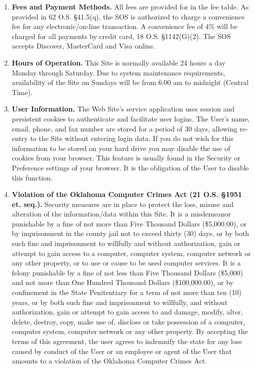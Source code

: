 \begin{enumerate}
    \item \textbf{Fees and Payment Methods.} All fees are provided for in the
    fee table. As provided in 62 O.S. §41.5(q), the SOS is authorized to charge
    a convenience fee for any electronic/on-line transaction. A convenience fee
    of 4\% will be charged for all payments by credit card, 18 O.S. §1142(G)(2).
    The SOS accepts Discover, MasterCard and Visa online.

    \item \textbf{Hours of Operation.} This Site is normally available 24 hours
    a day Monday through Saturday. Due to system maintenance requirements,
    availability of the Site on Sundays will be from 6:00 am to midnight
    (Central Time).

    \item \textbf{User Information.} The Web Site's service application uses
    session and persistent cookies to authenticate and facilitate user logins.
    The User's name, email, phone, and fax number are stored for a period of 30
    days, allowing re-entry to the Site without entering login data. If you do
    not wish for this information to be stored on your hard drive you may
    disable the use of cookies from your browser. This feature is usually found
    in the Security or Preference settings of your browser. It is the obligation
    of the User to disable this function.

    \item \textbf{Violation of the Oklahoma Computer Crimes Act (21 O.S. §1951
    et. seq.).} Security measures are in place to protect the loss, misuse and
    alteration of the information/data within this Site. It is a misdemeanor
    punishable by a fine of not more than Five Thousand Dollars (\$5,000.00), or
    by imprisonment in the county jail not to exceed thirty (30) days, or by
    both such fine and imprisonment to willfully and without authorization, gain
    or attempt to gain access to a computer, computer system, computer network
    or any other property, or to use or cause to be used computer services. It
    is a felony punishable by a fine of not less than Five Thousand Dollars
    (\$5,000) and not more than One Hundred Thousand Dollars (\$100,000.00), or
    by confinement in the State Penitentiary for a term of not more than ten
    (10) years, or by both such fine and imprisonment to willfully, and without
    authorization, gain or attempt to gain access to and damage, modify, alter,
    delete, destroy, copy, make use of, disclose or take possession of a
    computer, computer system, computer network or any other property. By
    accepting the terms of this agreement, the user agrees to indemnify the
    state for any loss caused by conduct of the User or an employee or agent of
    the User that amounts to a violation of the Oklahoma Computer Crimes Act.


\end{enumerate}
